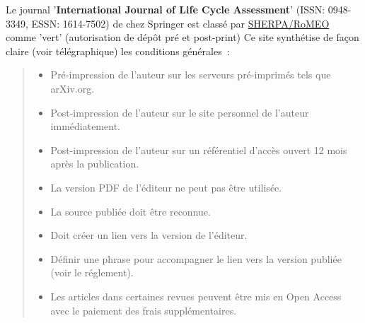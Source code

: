 
Le journal '\textbf{International Journal of Life Cycle Assessment}' (ISSN: 0948-3349, ESSN: 1614-7502) de chez Springer est classé par \href{http://www.sherpa.ac.uk/romeo/issn/0948-3349/}{SHERPA/RoMEO} comme 'vert' (autorisation de dépôt pré et post-print)
Ce site synthétise de façon claire (voir télégraphique) les conditions générales~:
\blockcquote{_sherpa/romeo_????}{
\begin{itemize}
 \item Pré-impression de l'auteur sur les serveurs pré-imprimés tels que arXiv.org.
 \item Post-impression de l'auteur sur le site personnel de l'auteur immédiatement.
 \item Post-impression de l'auteur sur un référentiel d'accès ouvert 12 mois après la publication.
 \item La version PDF de l'éditeur ne peut pas être utilisée.
 \item La source publiée doit être reconnue.
 \item Doit créer un lien vers la version de l'éditeur.
 \item Définir une phrase pour accompagner le lien vers la version publiée (voir le réglement).
 \item Les articles dans certaines revues peuvent être mis en Open Access avec le paiement des frais supplémentaires.
\end{itemize}
}
